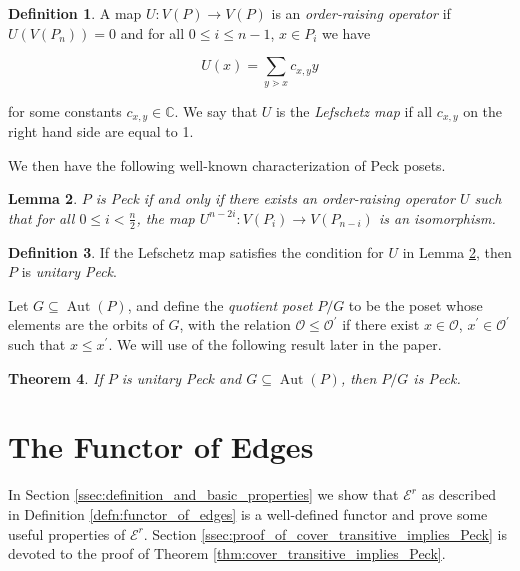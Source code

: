 \documentclass[10 pt]{amsart}
\theoremstyle{plain}
\newtheorem{thm}{Theorem}[section]
\newtheorem{lem}[thm]{Lemma}
\theoremstyle{definition}
\newtheorem{defn}[thm]{Definition}
\theoremstyle{remark}
\numberwithin{equation}{section}
\begin{document}
\begin{defn}
\label{defn:lefschetz}
A map $U\colon V(P)\rightarrow V(P)$ is an \textit{order-raising operator} if $U(V(P_n)) = 0$ and for all $0\le i\le n-1$, $x\in P_i$ we have

$$U(x) = \sum_{y\gtrdot x} c_{x,y}y$$

\noindent for some constants $c_{x,y}\in \mathbb{C}$.  We say that $U$ is the \textit{Lefschetz map} if all $c_{x,y}$ on the right hand side are equal to 1.
\end{defn}

\noindent We then have the following well-known characterization of Peck posets.

\begin{lem}\label{lem:Peck_poset_characterization}
$P$ is Peck if and only if there exists an order-raising operator $U$ such that for all $0\le i < \frac{n}{2}$, the map $U^{n-2i}\colon V(P_i)\rightarrow V(P_{n-i})$ is an isomorphism.
\end{lem}

\begin{defn}
If the Lefschetz map satisfies the condition for $U$ in Lemma \ref{lem:Peck_poset_characterization}, then $P$ is \textit{unitary Peck}.
\end{defn}


Let $G\subseteq \operatorname{Aut}(P)$, and define the \textit{quotient poset} $P/G$ to be the poset whose elements are the orbits of $G$, with the relation $\mathcal{O}\le \mathcal{O}^\prime$ if there exist $x\in \mathcal{O}$, $x^\prime\in \mathcal{O}^\prime$ such that $x\le x^\prime$.  We will use of the following result later in the paper.

\begin{thm}
\label{thm:quotients_of_unitary_peck_posets}
If $P$ is unitary Peck and $G\subseteq\operatorname{Aut}(P)$, then $P/G$ is Peck.
\end{thm}



\section{The Functor of Edges}
\label{sec:functor_of_edges}

In Section \ref{ssec:definition_and_basic_properties} we show that $\mathcal E^r$ as described in Definition \ref{defn:functor_of_edges} is a well-defined functor and prove some useful properties of $\mathcal E^r$.  Section \ref{ssec:proof_of_cover_transitive_implies_Peck} is devoted to the proof of Theorem \ref{thm:cover_transitive_implies_Peck}.
\end{document}
